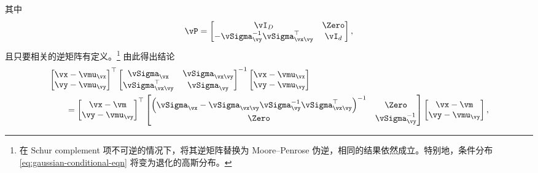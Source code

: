 \documentclass[../../book-main_zh.tex]{subfiles}
\begin{document}
\begin{exercise}
\begin{enumerate}
\begin{equation}
            \end{equation}
            其中
            \begin{equation}
                \vP =
                \begin{bmatrix}
                    \vI_D & \Zero\\
                    -\vSigma_{\vy}^{-1}\vSigma_{\vx\vy}^\top & \vI_d
                \end{bmatrix},
            \end{equation}
            且只要相关的逆矩阵有定义。\footnote{在 Schur complement 项不可逆的情况下，将其逆矩阵替换为 Moore--Penrose 伪逆，相同的结果依然成立。特别地，条件分布 \eqref{eq:gaussian-conditional-eqn} 将变为退化的高斯分布。}
            由此得出结论
            \begin{align}
                &
                \begin{bmatrix}
                    \vx-\vmu_{\vx} \\
                    \vy-\vmu_{\vy}
                \end{bmatrix}^{\top}
                \begin{bmatrix}
                    \vSigma_{\vx} & \vSigma_{\vx\vy} \\
                    \vSigma_{\vx\vy}^\top & \vSigma_{\vy}
                \end{bmatrix}^{-1}
                \begin{bmatrix}
                    \vx-\vmu_{\vx} \\
                    \vy-\vmu_{\vy}
                \end{bmatrix}
                \\
                &\qquad=
                \begin{bmatrix}
                    \vx - \vm \\
                    \vy - \vmu_{\vy}
                \end{bmatrix}^\top
                \begin{bmatrix}
                    \left(\vSigma_{\vx} - \vSigma_{\vx\vy}
                        \vSigma_{\vy}^{-1}
                    \vSigma_{\vx\vy}^{\top}\right)^{-1} & \Zero \\
                    \Zero & \vSigma_{\vy}^{-1}
                \end{bmatrix}
                \begin{bmatrix}
                    \vx - \vm \\
                    \vy - \vmu_{\vy}
                \end{bmatrix},

\end{align}
\end{enumerate}
\end{exercise}
\end{document}
